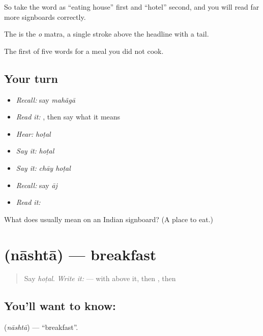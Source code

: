 So take the word as \textquotedblleft{}eating house\textquotedblright{} first and \textquotedblleft{}hotel\textquotedblright{} second, and you will read far more signboards correctly.

The  is the \emph{o} matra, a single stroke above the headline with a tail.

\begin{grammarlens}[title={What you've built}]
The first of five words for a meal you did not cook.
\end{grammarlens}

\subsection*{Your turn}
\begin{itemize}
\raggedright
  \item \emph{Recall:} say \emph{mahãgā}
  \item \emph{Read it:} \textbf{}, then say what it means
  \item \emph{Hear:} \emph{hoṭal}
  \item \emph{Say it:} \emph{hoṭal}
  \item \emph{Say it:} \emph{chāy hoṭal}
  \item \emph{Recall:} say \emph{āj}
  \item \emph{Read it:} \textbf{}
\end{itemize}

\begin{tcolorbox}[breakable,colback=teal!4,colframe=teal!35!black,title={Before you move on}]
What does  usually mean on an Indian signboard? (A place to eat.)
\end{tcolorbox}
\section[\texorpdfstring{\hi{नाश्ता} (nāshtā)}{नाश्ता (nāshtā)}]{ (nāshtā) — breakfast}

\label{lesson:HI-C73-breakfast}



\begin{quote}
Say \emph{hoṭal}. \emph{Write it:} \textbf{} —  with  above it, then , then 
\end{quote}

\subsection*{You'll want to know: }
\textbf{} (\emph{nāshtā}) — \textquotedblleft{}breakfast\textquotedblright{}.

